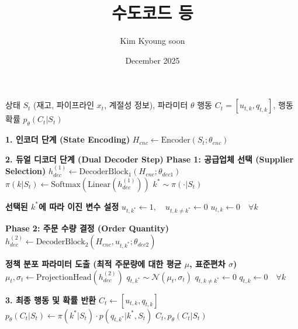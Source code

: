 \documentclass{article}
\title{수도코드 등}
\author{Kim Kyoung soon}
\date{December 2025}
\begin{document}
\begin{algorithm}[hbt!]
\caption{다중 공급업체 환경의 인코더-듀얼 디코더 순전파}
\label{alg:dual_decoder_sclsp_clean}
\begin{algorithmic}[1]
    \Require 상태 $S_t$ (재고, 파이프라인 $x_t$, 계절성 정보), 파라미터 $\theta$
    \Ensure 행동 $C_t = [u_{t,k}, q_{t,k}]$, 행동 확률 $p_\theta(C_t|S_t)$
    
    \State \textbf{1. 인코더 단계 (State Encoding)}
    \State \quad $H_{enc} \leftarrow \text{Encoder}(S_t; \theta_{enc})$ 
    
    \State \textbf{2. 듀얼 디코더 단계 (Dual Decoder Step)}
    \State \quad \textbf{Phase 1: 공급업체 선택 (Supplier Selection)}
    \State \quad {}
    \State \quad $h_{dec}^{(1)} \leftarrow \text{DecoderBlock}_1(H_{enc}; \theta_{dec1})$
    \State \quad $\pi(k|S_t) \leftarrow \text{Softmax}(\text{Linear}(h_{dec}^{(1)}))$ 
    \State \quad $k^* \sim \pi(\cdot|S_t)$ 
    
    \State \quad \textbf{선택된 $k^*$에 따라 이진 변수 설정}
        \State $u_{t, k^*} \leftarrow 1, \quad u_{t, k \neq k^*} \leftarrow 0$
    \Else {}
        \State $u_{t, k} \leftarrow 0 \quad \forall k$
    \EndIf

    \State \quad \textbf{Phase 2: 주문 수량 결정 (Order Quantity)}
     
        \State $h_{dec}^{(2)} \leftarrow \text{DecoderBlock}_2(H_{enc}, u_{t,k^*}; \theta_{dec2})$
        
        \State \quad \textbf{정책 분포 파라미터 도출  (최적 주문량에 대한 평균 $\mu$, 표준편차 $\sigma$)}
        \State $\mu_{t}, \sigma_{t} \leftarrow \text{ProjectionHead}(h_{dec}^{(2)})$
        \State $q_{t, k^*} \sim \mathcal{N}(\mu_{t}, \sigma_{t})$ 
        \State $q_{t, k \neq k^*} \leftarrow 0$
    \Else
        \State $q_{t,k} \leftarrow 0 \quad \forall k$
    \EndIf
    
    \State \textbf{3. 최종 행동 및 확률 반환}
    \State \quad $C_t \leftarrow [u_{t,k}, q_{t,k}]$
    \State \quad $p_\theta(C_t|S_t) \leftarrow \pi(k^*|S_t) \cdot p(q_{t, k^*} | k^*, S_t)$
    \State \Return $C_t, p_\theta(C_t|S_t)$
\end{algorithmic}
\end{algorithm}
\end{document}
